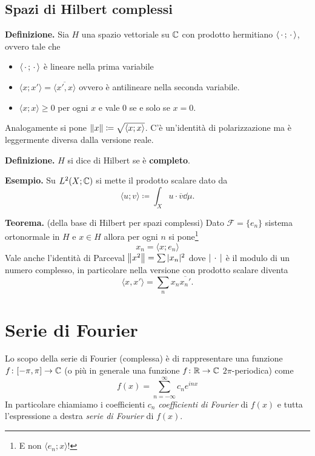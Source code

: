 %
%

\section{Spazi di Hilbert complessi}

\textbf{Definizione.}
Sia $H$ una spazio vettoriale su $\mathbb C$ con prodotto hermitiano $\langle\,\cdot\,; \,\cdot\,\rangle$, ovvero tale che
\begin{itemize}
	\item $\langle \,\cdot\,; \,\cdot\, \rangle$ è lineare nella prima variabile
	\item $\langle x; x' \rangle = \overline{\langle x', x \rangle}$ ovvero è antilineare nella seconda variabile.
	\item $\langle x; x \rangle \geq 0$ per ogni $x$ e vale $0$ se e solo se $x = 0$.
\end{itemize}

Analogamente si pone $\left\lVert x \right\rVert \coloneqq \sqrt{\langle x; x \rangle}$. C'è un'identità di polarizzazione ma è leggermente diversa dalla versione reale.

\textbf{Definizione.} $H$ si dice di Hilbert se è \textbf{completo}.

\textbf{Esempio.}
Su $L^2(X; \mathbb C)$ si mette il prodotto scalare dato da
$$
\langle u; v \rangle \coloneqq \int_X u \cdot \overline v \dd \mu.
$$

\textbf{Teorema.} (della base di Hilbert per spazi complessi)
Dato $\mathcal F = \{ e_n \}$ sistema ortonormale in $H$ e $x \in H$ allora per ogni $n$ si pone\footnote{E non $\langle e_n; x \rangle$!}
$$
x_n = \langle x; e_n \rangle
$$
Vale anche l'identità di Parceval $\left\lVert x^2 \right\rVert = \sum |x_n|^2$ dove $|\,\cdot\,|$ è il modulo di un numero complesso, in particolare nella versione con prodotto scalare diventa
$$
\langle x, x' \rangle = \sum_n x_n \overline{x_n'}.
$$

\chapter{Serie di Fourier}

Lo scopo della serie di Fourier (complessa) è di rappresentare una funzione $f \colon [-\pi, \pi] \to \mathbb C$ (o più in generale una funzione $f \colon \mathbb R \to \mathbb C$ $2\pi$-periodica) come
$$
f(x) = \sum_{n=-\infty}^\infty c_n e^{i n x}
$$
In particolare chiamiamo i coefficienti $c_n$ \textit{coefficienti di Fourier} di $f(x)$ e tutta l'espressione a destra \textit{serie di Fourier} di $f(x)$.

